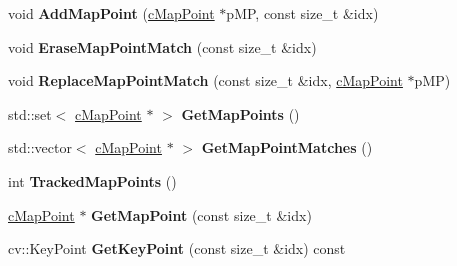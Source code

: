 \begin{DoxyCompactItemize}
\item 
void {\bfseries Add\+Map\+Point} (\hyperlink{classMultiColSLAM_1_1cMapPoint}{c\+Map\+Point} $\ast$p\+MP, const size\+\_\+t \&idx)\hypertarget{classMultiColSLAM_1_1cMultiKeyFrame_a960929e1797ccc1bf0487cd2f4ceb933}{}\label{classMultiColSLAM_1_1cMultiKeyFrame_a960929e1797ccc1bf0487cd2f4ceb933}

\item 
void {\bfseries Erase\+Map\+Point\+Match} (const size\+\_\+t \&idx)\hypertarget{classMultiColSLAM_1_1cMultiKeyFrame_af9c6cdf0bd2998f5e8aa076678dc8ce5}{}\label{classMultiColSLAM_1_1cMultiKeyFrame_af9c6cdf0bd2998f5e8aa076678dc8ce5}

\item 
void {\bfseries Replace\+Map\+Point\+Match} (const size\+\_\+t \&idx, \hyperlink{classMultiColSLAM_1_1cMapPoint}{c\+Map\+Point} $\ast$p\+MP)\hypertarget{classMultiColSLAM_1_1cMultiKeyFrame_ac338f39a3c0840ad26baba9435c8a407}{}\label{classMultiColSLAM_1_1cMultiKeyFrame_ac338f39a3c0840ad26baba9435c8a407}

\item 
std\+::set$<$ \hyperlink{classMultiColSLAM_1_1cMapPoint}{c\+Map\+Point} $\ast$ $>$ {\bfseries Get\+Map\+Points} ()\hypertarget{classMultiColSLAM_1_1cMultiKeyFrame_a6b519372f60093b06839adcbb4547aaf}{}\label{classMultiColSLAM_1_1cMultiKeyFrame_a6b519372f60093b06839adcbb4547aaf}

\item 
std\+::vector$<$ \hyperlink{classMultiColSLAM_1_1cMapPoint}{c\+Map\+Point} $\ast$ $>$ {\bfseries Get\+Map\+Point\+Matches} ()\hypertarget{classMultiColSLAM_1_1cMultiKeyFrame_aabfb52ce955eee5664955ef296d1896d}{}\label{classMultiColSLAM_1_1cMultiKeyFrame_aabfb52ce955eee5664955ef296d1896d}

\item 
int {\bfseries Tracked\+Map\+Points} ()\hypertarget{classMultiColSLAM_1_1cMultiKeyFrame_a029148c90cb994997f9177cb4032d1f4}{}\label{classMultiColSLAM_1_1cMultiKeyFrame_a029148c90cb994997f9177cb4032d1f4}

\item 
\hyperlink{classMultiColSLAM_1_1cMapPoint}{c\+Map\+Point} $\ast$ {\bfseries Get\+Map\+Point} (const size\+\_\+t \&idx)\hypertarget{classMultiColSLAM_1_1cMultiKeyFrame_ade9d96290b8329d95d5fcbac8d5217b5}{}\label{classMultiColSLAM_1_1cMultiKeyFrame_ade9d96290b8329d95d5fcbac8d5217b5}

\item 
cv\+::\+Key\+Point {\bfseries Get\+Key\+Point} (const size\+\_\+t \&idx) const \hypertarget{classMultiColSLAM_1_1cMultiKeyFrame_aa2a240859890704e7f49415eb74b2f0e}{}\label{classMultiColSLAM_1_1cMultiKeyFrame_aa2a240859890704e7f49415eb74b2f0e}


\end{DoxyCompactItemize}
